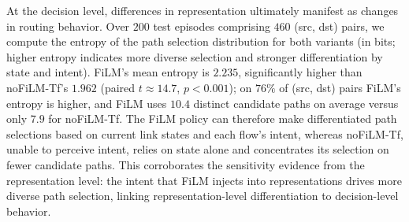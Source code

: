 At the decision level, differences in representation ultimately manifest as changes in routing behavior. Over $200$ test episodes comprising $460$ (src, dst) pairs, we compute the entropy of the path selection distribution for both variants (in bits; higher entropy indicates more diverse selection and stronger differentiation by state and intent). FiLM's mean entropy is $2.235$, significantly higher than noFiLM-Tf's $1.962$ (paired $t\!\approx\!14.7$, $p\!<\!0.001$); on $76\%$ of (src, dst) pairs FiLM's entropy is higher, and FiLM uses $10.4$ distinct candidate paths on average versus only $7.9$ for noFiLM-Tf. The FiLM policy can therefore make differentiated path selections based on current link states and each flow's intent, whereas noFiLM-Tf, unable to perceive intent, relies on state alone and concentrates its selection on fewer candidate paths. This corroborates the sensitivity evidence from the representation level: the intent that FiLM injects into representations drives more diverse path selection, linking representation-level differentiation to decision-level behavior.

